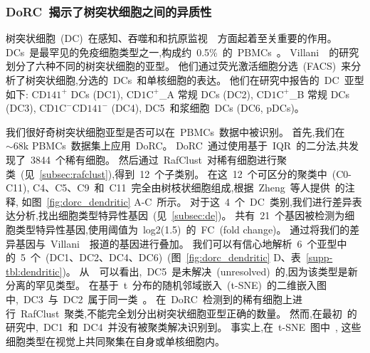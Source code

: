 \subsubsection{DoRC~揭示了树突状细胞之间的异质性}
树突状细胞~(DC)~在感知、吞噬和和抗原监视~\cite{villani2017single}~方面起着至关重要的作用。
DCs~是最罕见的免疫细胞类型之一,构成约~0.5\%~的~PBMCs~\cite{zheng2017massively}。
Villani~\cite{villani2017single}~的研究划分了六种不同的树突状细胞的亚型。
他们通过荧光激活细胞分选~(FACS)~来分析了树突状细胞,分选的~DCs~和单核细胞的表达。
他们在研究中报告的~DC~亚型如下:
$\text{CD141}^+$ DCs (DC1), 
$\text{CD1C}^+${\_}A 常规 DCs (DC2),
$\text{CD1C}^+${\_}B 常规 DCs (DC3),
$\text{CD1C}^-\text{CD141}^-$ (DC4), DC5~和浆细胞~DCs (DC6, pDCs)。

我们很好奇树突状细胞亚型是否可以在~PBMCs~数据中被识别。
首先,我们在~${\sim}68$k PBMCs~数据集上应用~DoRC。
DoRC~通过使用基于~IQR~的二分法,共发现了~3844~个稀有细胞。
然后通过~RafClust~对稀有细胞进行聚类~(见~\ref{subsec:rafclust}),得到~12~个子类别。
在这~12~个可区分的聚类中~(C0-C11),
C4、C5、C9~和~C11~完全由树枝状细胞组成,根据~Zheng~等人提供~\cite{zheng2017massively}的注释,
如图~\ref{fig:dorc_dendritic} A-C~所示。
对于这~4~个~DC~类别,我们进行差异表达分析,找出细胞类型特异性基因~(见~\ref{subsec:de})。
共有~21~个基因被检测为细胞类型特异性基因,使用阈值为~log2(1.5)~的~FC~(fold change)。
通过将我们的差异基因与~Villani~\cite{villani2017single}~报道的基因进行叠加。
我们可以有信心地解析~6~个亚型中的~5~个~(DC1、DC2、DC4、DC6)~(图~\ref{fig:dorc_dendritic} D、表~\ref{supp-tbl:dendritic})。
从~\cite{villani2017single}~可以看出,~DC5~是未解决~(unresolved)~的,因为该类型是新分离的罕见类型。
在基于~t~分布的随机邻域嵌入~(t-SNE)~的二维嵌入图中,~DC3~与~DC2~属于同一类~\cite{maaten2008visualizing}。
在~DoRC~检测到的稀有细胞上进行~RafClust~聚类,不能完全划分出树突状细胞亚型正确的数量。
然而,在最初~\cite{zheng2017massively}的研究中,~DC1~和~DC4~并没有被聚类解决识别到。
事实上,在~t-SNE~图中~\cite{zheng2017massively},
这些细胞类型在视觉上共同聚集在自身或单核细胞内。
